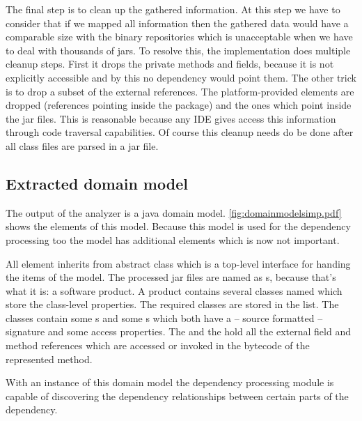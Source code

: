 The final step is to clean up the gathered information. At this step we have to
consider that if we mapped all information then the gathered data would have a
comparable size with the binary repositories which is unacceptable when we have
to deal with thousands of jars. To resolve this, the implementation does
multiple cleanup steps. First it drops the private methods and fields, because
it is not explicitly accessible and by this no dependency would point them. The
other trick is to drop a subset of the external references. The
platform-provided elements are dropped (references pointing inside the
 package) and the ones which point inside the jar files. This is
reasonable because any IDE gives access this information through code traversal
capabilities. Of course this cleanup needs do be done after all class files are 
parsed in a jar file. 


\subsection{Extracted domain model}
The output of the analyzer is a java domain model.
\autoref{fig:domainmodelsimp.pdf} shows the elements of this model. Because this
model is used for the dependency processing too the model has additional
elements which is now not important.

All element inherits from abstract  class which is a top-level
interface for handing the items of the model. The processed jar files are named
as s, because that's what it is: a software product. A product
contains several classes named  which store the class-level
properties. The required classes are stored in the 
list. The classes contain some s and some s which both
have a -- source formatted -- signature and some access properties. The
 and the  hold all the external
field and method references which are accessed or invoked in the bytecode of the
represented method.

With an instance of this domain model the dependency processing module is
capable of discovering the dependency relationships between certain parts of the
dependency.
 

